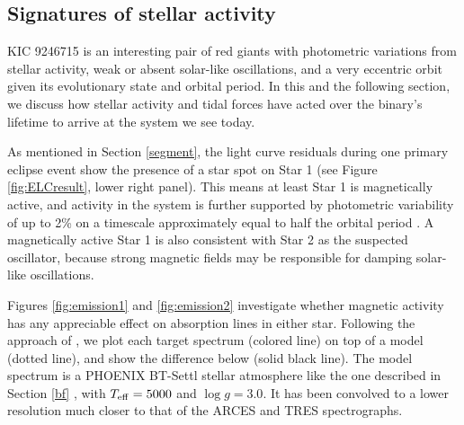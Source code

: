 \subsection{Signatures of stellar activity}\label{actrot}
KIC 9246715 is an interesting pair of red giants with photometric variations from stellar activity, weak or absent solar-like oscillations, and a very eccentric orbit given its evolutionary state and orbital period. In this and the following section, we discuss how stellar activity and tidal forces have acted over the binary's lifetime to arrive at the system we see today.

As mentioned in Section \ref{segment}, the light curve residuals during one primary eclipse event show the presence of a star spot on Star 1 (see Figure \ref{fig:ELCresult}, lower right panel). This means at least Star 1 is magnetically active, and activity in the system is further supported by photometric variability of up to 2\% on a timescale approximately equal to half the orbital period \citep{gau14}. A magnetically active Star 1 is also consistent with Star 2 as the suspected oscillator, because strong magnetic fields may be responsible for damping solar-like oscillations.

Figures \ref{fig:emission1} and \ref{fig:emission2} investigate whether magnetic activity has any appreciable effect on absorption lines in either star. Following the approach of \citet{fro12}, we plot each target spectrum (colored line) on top of a model (dotted line), and show the difference below (solid black line). The model spectrum is a PHOENIX BT-Settl stellar atmosphere like the one described in Section \ref{bf} \citep{all03,asp09}, with $T_{\rm{eff}} = 5000$ and $\log g = 3.0$. It has been convolved to a lower resolution much closer to that of the ARCES and TRES spectrographs.

